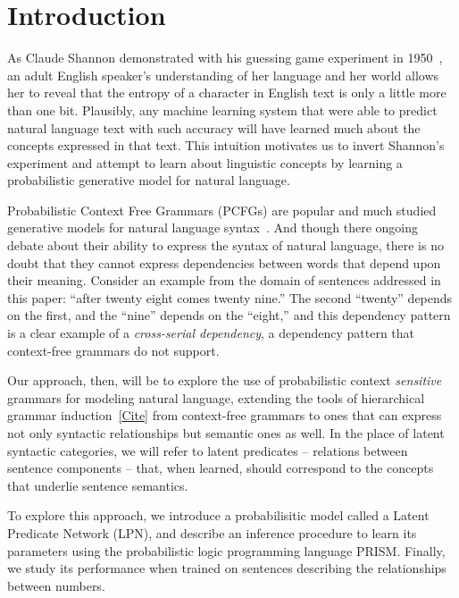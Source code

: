 \documentclass[11pt, twocolumn]{article}
\begin{document}

\section{Introduction}

As Claude Shannon demonstrated with his guessing game experiment in
1950~\cite{Shannon1950}, an adult English speaker's understanding of
her language and her world allows her to reveal that the entropy of a
character in English text is only a little more than one
bit. Plausibly, any machine learning system that were able to predict
natural language text with such accuracy will have learned much about
the concepts expressed in that text. This intuition motivates us to
invert Shannon's experiment and attempt to learn about linguistic
concepts by learning a probabilistic generative model for natural
language.

Probabilistic Context Free Grammars (PCFGs) are popular and much
studied generative models for natural language
syntax~\cite{Someone}. And though there ongoing debate about their
ability to express the syntax of natural language, there is no doubt
that they cannot express dependencies between words that depend upon
their meaning. Consider an example from the domain of sentences
addressed in this paper: ``after twenty eight comes twenty nine.''
The second ``twenty'' depends on the first, and the ``nine'' depends
on the ``eight,'' and this dependency pattern is a clear example of a
\emph{cross-serial dependency}, a dependency pattern that context-free
grammars do not support.

Our approach, then, will be to explore the use of probabilistic
context \emph{sensitive} grammars for modeling natural language,
extending the tools of hierarchical grammar induction~\ref{Cite} from
context-free grammars to ones that can express not only syntactic
relationships but semantic ones as well. In the place of latent
syntactic categories, we will refer to latent predicates -- relations
between sentence components -- that, when learned, should correspond
to the concepts that underlie sentence semantics.

To explore this approach, we introduce a probabilisitic model called a
Latent Predicate Network (LPN), and describe an inference procedure to
learn its parameters using the probabilistic logic programming
language PRISM. Finally, we study its performance when trained on
sentences describing the relationships between numbers.
\end{document}
